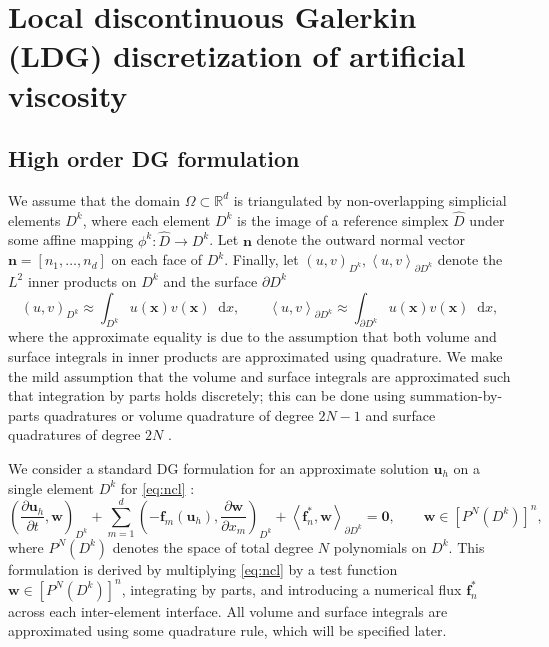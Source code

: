 \documentclass{elsarticle}
\theoremstyle{definition}
\theoremstyle{plain}
\theoremstyle{plain}
\renewcommand{\hat}[1]{\widehat{#1}}
\newcommand{\diff}[1]{\mathop{}\!{\mathrm{d}#1}} %
\newcommand{\pd}[2]{\frac{\partial#1}{\partial#2}}
\newcommand{\LRp}[1]{\left( #1 \right)} %
\newcommand{\LRs}[1]{\left[ #1 \right]} %
\newcommand{\LRa}[1]{\left\langle #1 \right\rangle} %
\newcommand{\refone}[1]{{\color{red}#1}}
\renewcommand{\refone}[1]{#1}
\begin{document}
\section{Local discontinuous Galerkin (LDG) discretization of artificial viscosity}\label{sec:section_3}

\subsection{High order DG formulation}
We assume that the domain $\Omega \subset \mathbb{R}^d$ is triangulated by non-overlapping simplicial elements $D^k$, where each element $D^k$ is the image of a reference simplex $\hat{D}$ under some affine mapping $\phi^k: \hat{D} \rightarrow D^k$. Let $\bm{n}$ denote the outward normal vector $\bm{n} = \LRs{n_1,\dots,n_d}$ on each face of $D^k$.
Finally, let $(u,v)_{D^k}, \LRa{u,v}_{\partial D^k}$ denote the $L^2$ inner products on $D^k$ and the surface $\partial D^k$
\[
(u,v)_{D^k} \approx \int_{D^k} u(\bm{x})v(\bm{x}) \diff{x}, \qquad \LRa{u,v}_{\partial D^k} \approx \int_{\partial D^k} u(\bm{x})v(\bm{x}) \diff{x},
\]
where the approximate equality is due to the assumption that both volume and surface integrals in inner products are approximated using quadrature. \refone{We make the mild assumption that the volume and surface integrals are approximated such that integration by parts holds discretely; this can be done using summation-by-parts quadratures \cite{hicken2016multidimensional} or volume quadrature of degree $2N-1$ and surface quadratures of degree $2N$ \cite{chan2019skew}.}

We consider a standard DG formulation for an approximate solution $\bm{u}_h$ on a single element $D^k$ for \eqref{eq:ncl} \cite{hesthaven2007nodal, karniadakis2005spectral}:
\begin{equation}
\LRp{\pd{\bm{u}_h}{t}, \bm{w}}_{D^k} + \sum_{m=1}^d \LRp{-\bm{f}_m(\bm{u}_h), \pd{\bm{w}}{x_m}}_{D^k} + \LRa{\bm{f}_n^*, \bm{w}}_{\partial D^k} = \bm{0}, \qquad \bm{w} \in \LRs{P^N(D^k)}^n,
\label{eq:dg_form}
\end{equation}
where $P^N(D^k)$ denotes the space of total degree $N$ polynomials on $D^k$. 
This formulation is derived by multiplying \eqref{eq:ncl} by a test function $\bm{w} \in \LRs{P^N(D^k)}^n$, integrating by parts, and introducing a numerical flux $\bm{f}^*_n$ across each inter-element interface. All volume and surface integrals are approximated using some quadrature rule, which will be specified later.%
\end{document}
